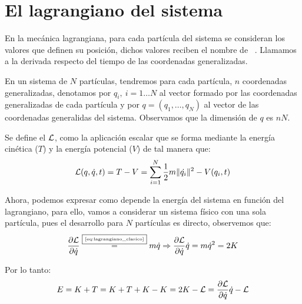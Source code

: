 \section{El lagrangiano del sistema}\label{sec:el-lagrangiano-del-sistema}
En la mecánica lagrangiana, para cada partícula del sistema se consideran los valores que definen su posición, dichos valores reciben el nombre de ~\cite{GTP}.
Llamamos  a la derivada respecto del tiempo de las coordenadas generalizadas.

En un sistema de $N$ partículas, tendremos para cada partícula, $n$ coordenadas generalizadas, denotamos por $q_i,\ i=1\dots N$ al vector formado por las coordenadas generalizadas de cada partícula y por $q=(q_1,\dots,q_N)$ al vector de las coordenadas generalidas del sistema.
Observamos que la dimensión de $q$ es $nN$.

Se define el  $\mathcal{L}$, como la aplicación escalar que se forma mediante la energía cinética ($T$) y la energía potencial ($V$) de tal manera que:
\begin{equation}
	\label{eq:lagrangiano_clasico}
	\mathcal{L}(q,\dot{q},t)=T-V=\sum\limits_{i=1}^{N} \frac{1}{2}m\|\dot{q_i}\|^2-V(q_i,t)
\end{equation}

Ahora, podemos expresar como depende la energía del sistema en función del lagrangiano, para ello, vamos a considerar un sistema físico con una sola partícula, pues el desarrollo para $N$ partículas es directo, observemos que:
\begin{equation*}
	\frac{\partial\mathcal{L}}{\partial\dot{q}}\overset{\fbox{\tiny \ref{eq:lagrangiano_clasico}}}{=}m\dot{q}\Rightarrow \frac{\partial\mathcal{L}}{\partial\dot{q}}\dot{q} =m\dot{q}^2 = 2K
\end{equation*}

Por lo tanto:
\begin{equation}
	\label{eq:energia-lagrangiana}
	E=K+T=K+T+K-K=2K-\mathcal{L}=\frac{\partial\mathcal{L}}{\partial\dot{q}}\dot{q}-\mathcal{L}
\end{equation}